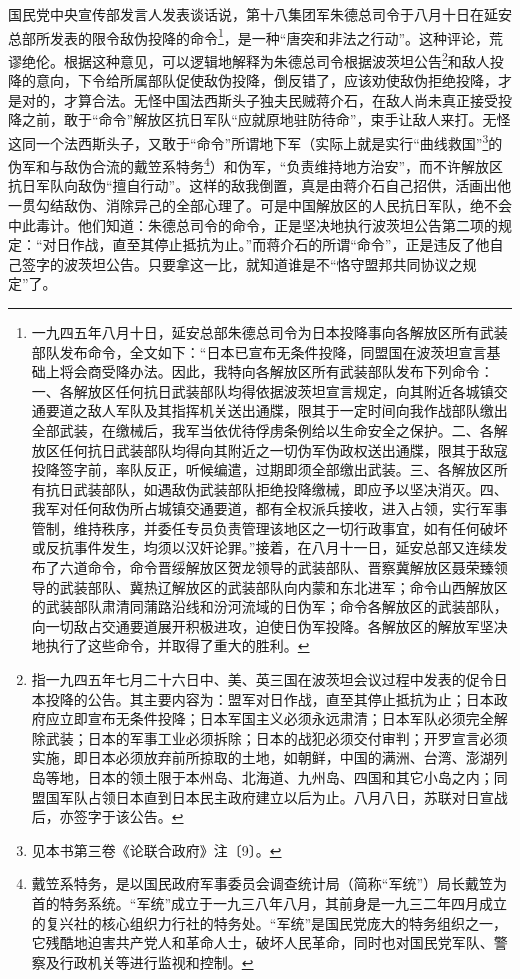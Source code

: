 \documentclass[cn,11pt,chinese]{elegantbook}
\begin{document}
国民党中央宣传部发言人发表谈话说，第十八集团军朱德总司令于八月十日在延安总部所发表的限令敌伪投降的命令\footnote[1]{ 一九四五年八月十日，延安总部朱德总司令为日本投降事向各解放区所有武装部队发布命令，全文如下：“日本已宣布无条件投降，同盟国在波茨坦宣言基础上将会商受降办法。因此，我特向各解放区所有武装部队发布下列命令：一、各解放区任何抗日武装部队均得依据波茨坦宣言规定，向其附近各城镇交通要道之敌人军队及其指挥机关送出通牒，限其于一定时间向我作战部队缴出全部武装，在缴械后，我军当依优待俘虏条例给以生命安全之保护。二、各解放区任何抗日武装部队均得向其附近之一切伪军伪政权送出通牒，限其于敌寇投降签字前，率队反正，听候编遣，过期即须全部缴出武装。三、各解放区所有抗日武装部队，如遇敌伪武装部队拒绝投降缴械，即应予以坚决消灭。四、我军对任何敌伪所占城镇交通要道，都有全权派兵接收，进入占领，实行军事管制，维持秩序，并委任专员负责管理该地区之一切行政事宜，如有任何破坏或反抗事件发生，均须以汉奸论罪。”接着，在八月十一日，延安总部又连续发布了六道命令，命令晋绥解放区贺龙领导的武装部队、晋察冀解放区聂荣臻领导的武装部队、冀热辽解放区的武装部队向内蒙和东北进军；命令山西解放区的武装部队肃清同蒲路沿线和汾河流域的日伪军；命令各解放区的武装部队，向一切敌占交通要道展开积极进攻，迫使日伪军投降。各解放区的解放军坚决地执行了这些命令，并取得了重大的胜利。}，是一种“唐突和非法之行动”。这种评论，荒谬绝伦。根据这种意见，可以逻辑地解释为朱德总司令根据波茨坦公告\footnote[2]{ 指一九四五年七月二十六日中、美、英三国在波茨坦会议过程中发表的促令日本投降的公告。其主要内容为：盟军对日作战，直至其停止抵抗为止；日本政府应立即宣布无条件投降；日本军国主义必须永远肃清；日本军队必须完全解除武装；日本的军事工业必须拆除；日本的战犯必须交付审判；开罗宣言必须实施，即日本必须放弃前所掠取的土地，如朝鲜，中国的满洲、台湾、澎湖列岛等地，日本的领土限于本州岛、北海道、九州岛、四国和其它小岛之内；同盟国军队占领日本直到日本民主政府建立以后为止。八月八日，苏联对日宣战后，亦签字于该公告。}和敌人投降的意向，下令给所属部队促使敌伪投降，倒反错了，应该劝使敌伪拒绝投降，才是对的，才算合法。无怪中国法西斯头子独夫民贼蒋介石，在敌人尚未真正接受投降之前，敢于“命令”解放区抗日军队“应就原地驻防待命”，束手让敌人来打。无怪这同一个法西斯头子，又敢于“命令”所谓地下军（实际上就是实行“曲线救国”\footnote[3]{ 见本书第三卷《论联合政府》注〔9〕。}的伪军和与敌伪合流的戴笠系特务\footnote[4]{ 戴笠系特务，是以国民政府军事委员会调查统计局（简称“军统”）局长戴笠为首的特务系统。“军统”成立于一九三八年八月，其前身是一九三二年四月成立的复兴社的核心组织力行社的特务处。“军统”是国民党庞大的特务组织之一，它残酷地迫害共产党人和革命人士，破坏人民革命，同时也对国民党军队、警察及行政机关等进行监视和控制。}）和伪军，“负责维持地方治安”，而不许解放区抗日军队向敌伪“擅自行动”。这样的敌我倒置，真是由蒋介石自己招供，活画出他一贯勾结敌伪、消除异己的全部心理了。可是中国解放区的人民抗日军队，绝不会中此毒计。他们知道：朱德总司令的命令，正是坚决地执行波茨坦公告第二项的规定：“对日作战，直至其停止抵抗为止。”而蒋介石的所谓“命令”，正是违反了他自己签字的波茨坦公告。只要拿这一比，就知道谁是不“恪守盟邦共同协议之规定”了。\\
\end{document}
